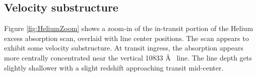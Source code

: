 \documentclass[twocolumn]{aastex631}
\begin{document}
\subsection{Velocity substructure}
Figure \ref{fig:HeliumZoom} shows a zoom-in of the in-transit portion of the Helium excess absorption scan, overlaid with line center positions.  The scan appears to exhibit some velocity substructure.  At transit ingress, the absorption appears more centrally concentrated near the vertical 10833 \AA~ line.  The line depth gets slightly shallower with a slight redshift approaching transit mid-center. 



\end{document}
